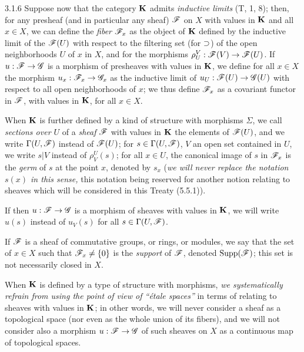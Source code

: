 \documentclass[../main.tex]{subfiles}
\begin{document}
\begin{cx}{3.1.6}
Suppose now that the category $\mathbf{K}$ admits \emph{inductive limits} (T, 1, 8);
then, for any presheaf (and in particular any sheaf) $\mathscr{F}$ on $X$ with
values in $\mathbf{K}$ and all $x\in X$, we can define the \emph{fiber} $\mathscr{F}_x$ as the object of $\mathbf{K}$ defined
by the inductive limit of the $\mathscr{F}(U)$ with respect to the filtering set
(for $\supset$) of the open neighborhoods $U$ of $x$ in $X$, and for the morphisms $\rho_U^V:\mathscr{F}(V)\to\mathscr{F}(U)$.
If $u:\mathscr{F}\to\mathscr{G}$ is a morphism of presheaves with values in $\mathbf{K}$, we define for all
$x\in X$ the morphism $u_x:\mathscr{F}_x\to\mathscr{G}_x$ as the inductive limit of $u_U:\mathscr{F}(U)\to\mathscr{G}(U)$ with respect to all
open neighborhoods of $x$; we thus define $\mathscr{F}_x$ as a covariant functor in $\mathscr{F}$, with values in $\mathbf{K}$, for
all $x\in X$.

When $\mathbf{K}$ is further defined by a kind of structure with morphisms $\Sigma$,
we call \emph{sections over $U$} of a \emph{sheaf} $\mathscr{F}$ with values in $\mathbf{K}$ the elements
of $\mathscr{F}(U)$, and we write $\Gamma(U,\mathscr{F})$ instead of $\mathscr{F}(U)$; for $s\in\Gamma(U,\mathscr{F})$, $V$ an open set
contained in $U$, we write $s|V$ instead of $\rho_V^U(s)$; for all $x\in U$, the canonical image
of $s$ in $\mathscr{F}_x$ is the \emph{germ} of $s$ at the point $x$, denoted by $s_x$ (\emph{we will never replace
the notation $s(x)$ in this sense,} this notation being reserved for another notion relating to sheaves
which will be considered in this Treaty (5.5.1)).

If then $u:\mathscr{F}\to\mathscr{G}$ is a morphism of sheaves with values in $\mathbf{K}$, we will write $u(s)$
instead of $u_V(s)$ for all $s\in\Gamma(U,\mathscr{F})$.

If $\mathscr{F}$ is a sheaf of commutative groups, or rings, or modules, we say
that the set of $x\in X$ such that $\mathscr{F}_x\neq\{0\}$ is the \emph{support} of $\mathscr{F}$, denoted
$\operatorname*{Supp}(\mathscr{F})$; this set is not necessarily closed in $X$.

When $\mathbf{K}$ is defined by a type of structure with morphisms, \emph{we
systematically refrain from using the point of view of ``{\'e}tale spaces''} in terms of
relating to sheaves with values in $\mathbf{K}$; in other words, we will never consider
a sheaf as a topological space (nor even as the whole union of its
fibers), and we will not consider also a morphism $u:\mathscr{F}\to\mathscr{G}$ of such sheaves
on $X$ as a continuous map of topological spaces.
\end{cx}
\end{document}
